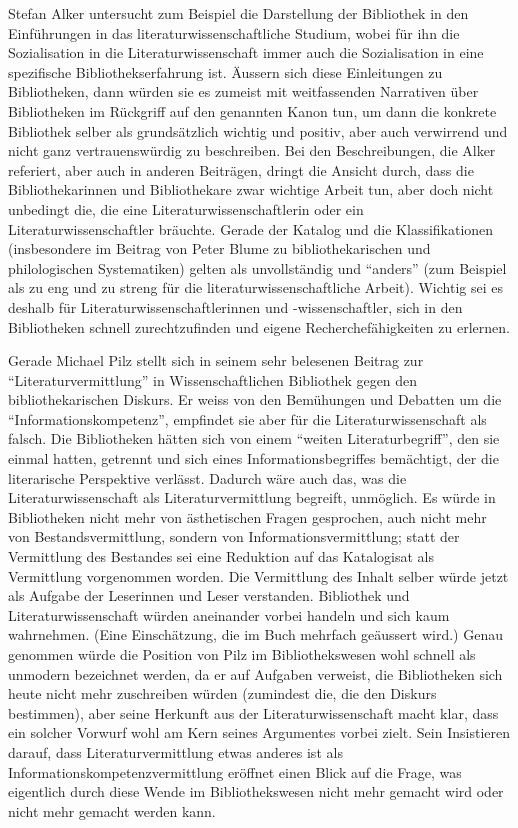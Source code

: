 \documentclass[a4paper,
fontsize=11pt,
oneside,
numbers=noperiodatend,
parskip=half-,
bibliography=totoc,
final
]{scrartcl}
\begin{document}
Stefan Alker untersucht zum Beispiel die Darstellung der Bibliothek in
den Einführungen in das literaturwissenschaftliche Studium, wobei für
ihn die Sozialisation in die Literaturwissenschaft immer auch die
Sozialisation in eine spezifische Bibliothekserfahrung ist. Äussern sich
diese Einleitungen zu Bibliotheken, dann würden sie es zumeist mit
weitfassenden Narrativen über Bibliotheken im Rückgriff auf den
genannten Kanon tun, um dann die konkrete Bibliothek selber als
grundsätzlich wichtig und positiv, aber auch verwirrend und nicht ganz
vertrauenswürdig zu beschreiben. Bei den Beschreibungen, die Alker
referiert, aber auch in anderen Beiträgen, dringt die Ansicht durch,
dass die Bibliothekarinnen und Bibliothekare zwar wichtige Arbeit tun,
aber doch nicht unbedingt die, die eine Literaturwissenschaftlerin oder
ein Literaturwissenschaftler bräuchte. Gerade der Katalog und die
Klassifikationen (insbesondere im Beitrag von Peter Blume zu
bibliothekarischen und philologischen Systematiken) gelten als
unvollständig und \enquote{anders} (zum Beispiel als zu eng und zu
streng für die literaturwissenschaftliche Arbeit). Wichtig sei es
deshalb für Literaturwissenschaftlerinnen und -wissenschaftler, sich in
den Bibliotheken schnell zurechtzufinden und eigene Recherchefähigkeiten
zu erlernen.

Gerade Michael Pilz stellt sich in seinem sehr belesenen Beitrag zur
\enquote{Literaturvermittlung} in Wissenschaftlichen Bibliothek gegen
den bibliothekarischen Diskurs. Er weiss von den Bemühungen und Debatten
um die \enquote{Informationskompetenz}, empfindet sie aber für die
Literaturwissenschaft als falsch. Die Bibliotheken hätten sich von einem
\enquote{weiten Literaturbegriff}, den sie einmal hatten, getrennt und
sich eines Informationsbegriffes bemächtigt, der die literarische
Perspektive verlässt. Dadurch wäre auch das, was die
Literaturwissenschaft als Literaturvermittlung begreift, unmöglich. Es
würde in Bibliotheken nicht mehr von ästhetischen Fragen gesprochen,
auch nicht mehr von Bestandsvermittlung, sondern von
Informationsvermittlung; statt der Vermittlung des Bestandes sei eine
Reduktion auf das Katalogisat als Vermittlung vorgenommen worden. Die
Vermittlung des Inhalt selber würde jetzt als Aufgabe der Leserinnen und
Leser verstanden. Bibliothek und Literaturwissenschaft würden aneinander
vorbei handeln und sich kaum wahrnehmen. (Eine Einschätzung, die im Buch
mehrfach geäussert wird.) Genau genommen würde die Position von Pilz im
Bibliothekswesen wohl schnell als unmodern bezeichnet werden, da er auf
Aufgaben verweist, die Bibliotheken sich heute nicht mehr zuschreiben
würden (zumindest die, die den Diskurs bestimmen), aber seine Herkunft
aus der Literaturwissenschaft macht klar, dass ein solcher Vorwurf wohl
am Kern seines Argumentes vorbei zielt. Sein Insistieren darauf, dass
Literaturvermittlung etwas anderes ist als
Informationskompetenzvermittlung eröffnet einen Blick auf die Frage, was
eigentlich durch diese Wende im Bibliothekswesen nicht mehr gemacht wird
oder nicht mehr gemacht werden kann.
\end{document}
